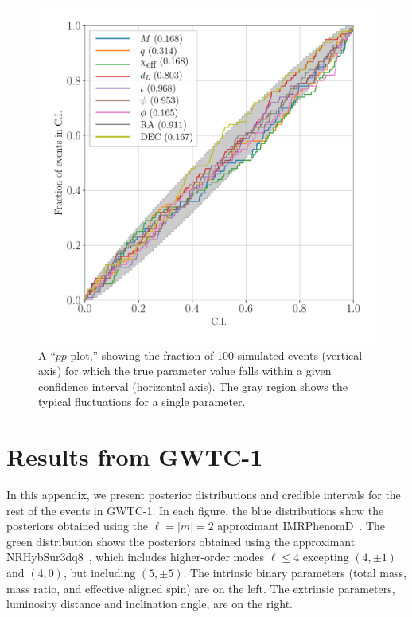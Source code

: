 \documentclass[prd,superscriptaddress,twocolumn,nopreprintnumbers,floatfix,longbibliography]{revtex4}
\newcommand{\sur}{{\sc NRHybSur3dq8}\xspace}
\begin{document}
\begin{appendix}
\begin{figure}[t!]
\centering
    \includegraphics[width=1\linewidth]{HM_pe_pp.pdf}
    \caption{
    A ``$pp$ plot,'' showing the fraction of 100 simulated events (vertical axis) for which the true parameter value falls within a given confidence interval (horizontal axis).
    The gray region shows the typical fluctuations for a single parameter.}
    \label{fig:pp}
\end{figure}

\section{Results from GWTC-1}\label{catalog_posteriors}
In this appendix, we present posterior distributions and credible intervals for the rest of the events in GWTC-1.
In each figure, the blue distributions show the posteriors obtained using the $\ell=|m|=2$ approximant {\sc IMRPhenomD}~\cite{IMRPhenomD}.
The green distribution shows the posteriors obtained using the approximant \sur~\cite{NRHybSur3dq8}, which includes higher-order modes $\ell\leq4$  excepting $(4,\pm1)$ and $(4,0)$, but including $(5,\pm5)$.
The intrinsic binary parameters (total mass, mass ratio, and effective aligned spin) are on the left.
The extrinsic parameters, luminosity distance and  inclination angle, are on the right.


\end{appendix}
\end{document}
